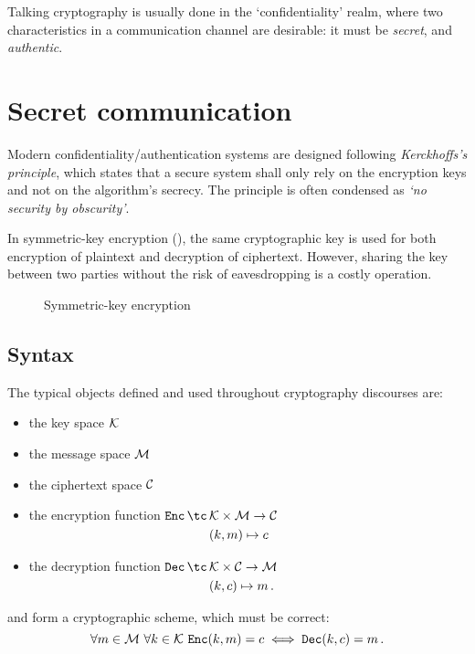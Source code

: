 Talking cryptography is usually done in the `confidentiality' realm, where two characteristics in a communication channel are desirable: it must be \emph{secret}, and \emph{authentic}.



\section{Secret communication}
Modern confidentiality/authentication systems are designed following \emph{Kerckhoffs's principle}, which states that a secure system shall only rely on the encryption keys and not on the algorithm's secrecy.
The principle is often condensed as \emph{`no security by obscurity'}.

In symmetric-key encryption (\ske), the same cryptographic key is used for both encryption of plaintext and decryption of ciphertext.
However, sharing the key between two parties without the risk of eavesdropping is a costly operation.

\begin{figure}[h]
	\centering
	
	\caption{Symmetric-key encryption}
\end{figure}


\subsection{Syntax}
The typical objects defined and used throughout cryptography discourses are:
%
\begin{itemize}[parsep=0pt]
    \item the key space $\mathcal{K}$
    \item the message space $\mathcal{M}$
    \item the ciphertext space $\mathcal{C}$
    \item the encryption function $\begin{aligned}[t]\Enc \, \tc \, & \K \times \M \to \C \\ & (k, m) \mapsto c\end{aligned}$
    \item the decryption function $\begin{aligned}[t]\Dec \, \tc \, & \K \times \C \to \M \\ & (k, c) \mapsto m \, . \end{aligned}$
\end{itemize}
\Enc{} and \Dec{} form a cryptographic scheme, which must be correct:
\[
    \forall m \in \mathcal{M} \ \forall k \in \mathcal{K} \ \texttt{Enc}(k, m) = c \iff \texttt{Dec}(k, c) = m \, .
\]


